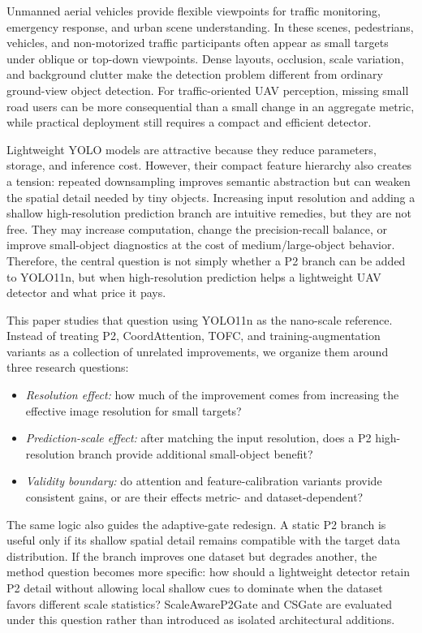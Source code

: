 \documentclass[journal]{IEEEtran}
\begin{document}
Unmanned aerial vehicles provide flexible viewpoints for traffic monitoring, emergency response, and urban scene understanding. In these scenes, pedestrians, vehicles, and non-motorized traffic participants often appear as small targets under oblique or top-down viewpoints. Dense layouts, occlusion, scale variation, and background clutter make the detection problem different from ordinary ground-view object detection. For traffic-oriented UAV perception, missing small road users can be more consequential than a small change in an aggregate metric, while practical deployment still requires a compact and efficient detector.

Lightweight YOLO models are attractive because they reduce parameters, storage, and inference cost. However, their compact feature hierarchy also creates a tension: repeated downsampling improves semantic abstraction but can weaken the spatial detail needed by tiny objects. Increasing input resolution and adding a shallow high-resolution prediction branch are intuitive remedies, but they are not free. They may increase computation, change the precision-recall balance, or improve small-object diagnostics at the cost of medium/large-object behavior. Therefore, the central question is not simply whether a P2 branch can be added to YOLO11n, but when high-resolution prediction helps a lightweight UAV detector and what price it pays.

This paper studies that question using YOLO11n as the nano-scale reference. Instead of treating P2, CoordAttention, TOFC, and training-augmentation variants as a collection of unrelated improvements, we organize them around three research questions:

\begin{itemize}
  \item \emph{Resolution effect:} how much of the improvement comes from increasing the effective image resolution for small targets?
  \item \emph{Prediction-scale effect:} after matching the input resolution, does a P2 high-resolution branch provide additional small-object benefit?
  \item \emph{Validity boundary:} do attention and feature-calibration variants provide consistent gains, or are their effects metric- and dataset-dependent?
\end{itemize}

The same logic also guides the adaptive-gate redesign. A static P2 branch is useful only if its shallow spatial detail remains compatible with the target data distribution. If the branch improves one dataset but degrades another, the method question becomes more specific: how should a lightweight detector retain P2 detail without allowing local shallow cues to dominate when the dataset favors different scale statistics? ScaleAwareP2Gate and CSGate are evaluated under this question rather than introduced as isolated architectural additions.
\end{document}
